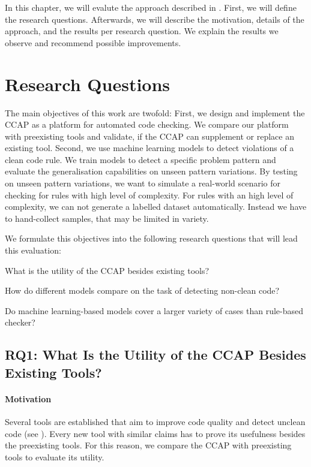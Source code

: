 In this chapter, we will evalute the approach described in . First, we will define the research questions. Afterwards, we will describe the motivation, details of the approach, and the results per research question. We explain the results we observe and recommend possible improvements.

\section{Research Questions}
The main objectives of this work are twofold: First, we design and implement the CCAP as a platform for automated code checking. We compare our platform with preexisting tools and validate, if the CCAP can supplement or replace an existing tool. 
Second, we use machine learning models to detect violations of a clean code rule. We train models to detect a specific problem pattern and evaluate the generalisation capabilities on unseen pattern variations. By testing on unseen pattern variations, we want to simulate a real-world scenario for checking for rules with high level of complexity. For rules with an high level of complexity, we can not generate a labelled dataset automatically. Instead we have to hand-collect samples, that may be limited in variety.

We formulate this objectives into the following research questions that will lead this evaluation:
\begin{description}
    \setlength{\itemsep}{1pt}
    \item[RQ1]What is the utility of the CCAP besides existing tools? 
    \item[RQ2]How do different models compare on the task of detecting non-clean code?
    \item[RQ3]Do machine learning-based models cover a larger variety of cases than rule-based checker? 
\end{description}

\subsection{RQ1: What Is the Utility of the CCAP Besides Existing Tools?}\label{rq:1}
\paragraph{Motivation}
Several tools are established that aim to improve code quality and detect unclean code (see ). Every new tool with similar claims has to prove its usefulness besides the preexisting tools. For this reason, we compare the CCAP with preexisting tools to evaluate its utility.

